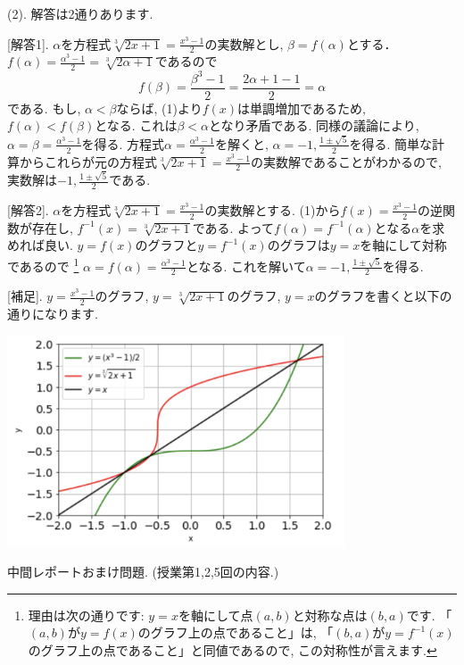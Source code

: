 \documentclass[dvipdfmx,a4paper,11pt]{article}
\theoremstyle{definition}
\begin{document}
(2). 解答は2通りあります.

[解答1]. $\alpha$を方程式$ \sqrt[3]{2x + 1} = \frac{x^3 - 1}{2}$の実数解とし, $\beta = f(\alpha)$とする．
$f(\alpha) = \frac{\alpha^3 -1}{2} = \sqrt[3]{2\alpha + 1} $であるので
$$
f(\beta) = \frac{\beta^3 -1}{2} = \frac{2 \alpha +1 -1}{2} =\alpha
$$ 
である.
もし, $\alpha < \beta$ならば, (1)より$f(x)$は単調増加であるため, $f(\alpha) <f( \beta)$となる.
 これは$\beta < \alpha$となり矛盾である.
 同様の議論により, $\alpha = \beta = \frac{\alpha^3 -1}{2}$を得る.
方程式$\alpha =  \frac{\alpha^3 -1}{2}$を解くと, $\alpha = -1, \frac{1 \pm \sqrt{5}}{2}$を得る.
簡単な計算からこれらが元の方程式$ \sqrt[3]{2x + 1} = \frac{x^3 - 1}{2}$の実数解であることがわかるので, 実数解は$-1, \frac{1 \pm \sqrt{5}}{2}$である.

[解答2]. $\alpha$を方程式$ \sqrt[3]{2x + 1} = \frac{x^3 - 1}{2}$の実数解とする. 
(1)から$ f(x) = \frac{x^3 -1 }{2}$の逆関数が存在し, $f^{-1}(x) = \sqrt[3]{2x + 1}$である. よって$f(\alpha) = f^{-1}(\alpha)$となる$\alpha$を求めれば良い.
$y=f(x)$のグラフと$y = f^{-1}(x)$のグラフは$y=x$を軸にして対称であるので
\footnote{理由は次の通りです: $y=x$を軸にして点$(a,b)$と対称な点は$(b,a)$です. 「$(a,b)$が$y=f(x)$のグラフ上の点であること」は, 「$(b,a)$が$y=f^{-1}(x)$のグラフ上の点であること」と同値であるので, この対称性が言えます.}
$\alpha=f(\alpha) = \frac{\alpha^3-1}{2}$となる.
 これを解いて$\alpha = -1, \frac{1 \pm \sqrt{5}}{2}$を得る.

[補足]. $y=\frac{x^3 - 1}{2}$のグラフ, $y=\sqrt[3]{2x + 1}$のグラフ, $y=x$のグラフを書くと以下の通りになります.

\begin{center}
  \includegraphics[width=10cm]{graph.jpg}
\end{center}


\vspace{33pt} 

{\Large 中間レポートおまけ問題.} (授業第1,2,5回の内容.)
\vspace{11pt}
\end{document}
